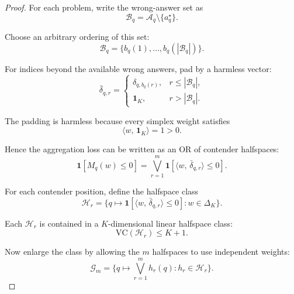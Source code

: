 \documentclass{article} %
\providecommand{\Aq}{\mathcal{A}_q}
\providecommand{\simplex}{\Delta_K}
\providecommand{\ip}[2]{\langle #1,\, #2\rangle}
\providecommand{\VC}{\mathrm{VC}}
\begin{document}
\begin{proof}
For each problem, write the wrong-answer set as
\begin{equation}
\label{eq:lem1-wrong-set}
\mathcal B_q
=
\Aq\setminus\{a_q^\star\}.
\end{equation}

Choose an arbitrary ordering of this set:
\begin{equation}
\label{eq:lem1-ordering}
\mathcal B_q
=
\{b_q(1),\ldots,b_q(|\mathcal B_q|)\}.
\end{equation}

For indices beyond the available wrong answers, pad by a harmless vector:
\begin{equation}
\label{eq:lem1-padding}
\bar\delta_{q,r}
=
\begin{cases}
\delta_{q,b_q(r)}, & r\le |\mathcal B_q|,\\
\mathbf 1_K, & r>|\mathcal B_q|.
\end{cases}
\end{equation}

The padding is harmless because every simplex weight satisfies
\begin{equation}
\label{eq:lem1-padding-harmless}
\ip{w}{\mathbf 1_K}=1>0 .
\end{equation}

Hence the aggregation loss can be written as an OR of contender halfspaces:
\begin{equation}
\label{eq:lem1-or}
\mathbf 1[M_q(w)\le 0]
=
\bigvee_{r=1}^{m}
\mathbf 1\!\left[\ip{w}{\bar\delta_{q,r}}\le 0\right].
\end{equation}

For each contender position, define the halfspace class
\begin{equation}
\label{eq:lem1-halfspace-class}
\mathcal H_r
=
\Big\{
q\mapsto
\mathbf 1\!\left[\ip{w}{\bar\delta_{q,r}}\le 0\right]
:
w\in\simplex
\Big\}.
\end{equation}

Each \(\mathcal H_r\) is contained in a \(K\)-dimensional linear halfspace class:
\begin{equation}
\label{eq:lem1-halfspace-vc}
\VC(\mathcal H_r)
\le
K+1 .
\end{equation}

Now enlarge the class by allowing the \(m\) halfspaces to use independent weights:
\begin{equation}
\label{eq:lem1-enlarged}
\mathcal G_m
=
\Big\{
q\mapsto \bigvee_{r=1}^{m} h_r(q)
:
h_r\in\mathcal H_r
\Big\}.
\end{equation}


\end{proof}
\end{document}
